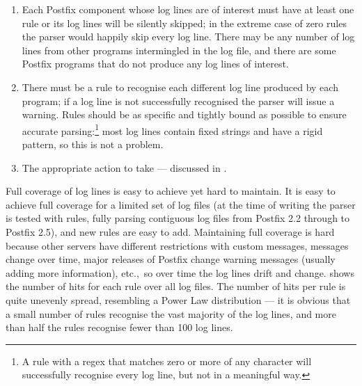 \begin{enumerate}

    \item Each Postfix component whose log lines are of interest must have
        at least one rule or its log lines will be silently skipped; in the
        extreme case of zero rules the parser would happily skip every log
        line.  There may be any number of log lines from other programs
        intermingled in the log file, and there are some Postfix programs
        that do not produce any log lines of interest.

    \item There must be a rule to recognise each different log line
        produced by each program; if a log line is not successfully
        recognised the parser will issue a warning.  Rules should be as
        specific and tightly bound as possible to ensure accurate
        parsing:\footnote{A rule with a regex that matches zero or more of
        any character will successfully recognise every log line, but not
        in a meaningful way.} most log lines contain fixed strings and have
        a rigid pattern, so this is not a problem.

    \item The appropriate action to take --- discussed in
        .

\end{enumerate}

Full coverage of log lines is easy to achieve yet hard to maintain.  It is
easy to achieve full coverage for a limited set of log files (at the time
of writing the parser is tested with \numberOFrules{} rules, fully parsing
\numberOFlogFILESall{} contiguous log files from Postfix 2.2 through to
Postfix 2.5), and new rules are easy to add.  Maintaining full coverage is
hard because other servers have different restrictions with custom
messages,  messages change over time, major releases of
Postfix change warning messages (usually adding more information), etc.,\
so over time the log lines drift and change.  
shows the number of hits for each rule over all \numberOFlogFILES{} log
files.  The number of hits per rule is quite unevenly spread, resembling a
Power Law distribution --- it is obvious that a small number of rules
recognise the vast majority of the log lines, and more than half the rules
recognise fewer than 100 log lines.

